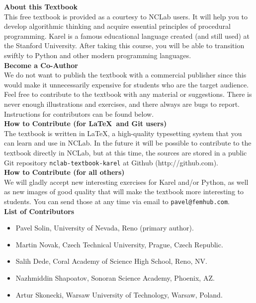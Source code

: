 \documentclass[article,A4,12pt]{llncs}
\begin{document}
{
\noindent
{\bf About this Textbook}\\[4mm]
This free textbook is provided as a courtesy to NCLab users. 
It will help you to develop algorithmic thinking and acquire essential
principles of procedural programming. Karel is a famous educational language 
created (and still used) at the Stanford University. After taking this course, 
you will be able to transition swiftly to Python and other modern programming 
languages. \\[4mm]

\noindent
{\bf Become a Co-Author}\\[4mm]
We do not want to publish the textbook with a commercial publisher since this 
would make it unnecessarily expensive for students who are the target audience. 
Feel free to contribute to the textbook with any material or suggestions. 
There is never enough illustrations and exercises, and there always are bugs 
to report. Instructions for contributors can be found below.\\[4mm]

\noindent
{\bf How to Contribute (for \LaTeX \ and Git users)}\\[4mm]
\noindent
The textbook is written in \LaTeX, a high-quality typesetting system that 
you can learn and use in NCLab. In the future it will be possible to contribute to 
the textbook directly in NCLab, but at this time, the sources are stored 
in a public Git repository {\tt nclab-textbook-karel} at Github (http://github.com). \\[4mm]

\noindent
{\bf How to Contribute (for all others)}\\[4mm]
\noindent
We will gladly accept new interesting exercises for Karel and/or Python, as well as
new images of good quality that will make the textbook more interesting to students. You
can send those at any time via email to {\tt pavel@femhub.com}.\\[4mm]

\noindent
{\bf List of Contributors}
\begin{itemize}
\item Pavel Solin, University of Nevada, Reno (primary author). 
\item Martin Novak, Czech Technical University, Prague, Czech Republic.
\item Salih Dede, Coral Academy of Science High School, Reno, NV.
\item Nazhmiddin Shapoatov, Sonoran Science Academy, Phoenix, AZ.
\item Artur Skonecki, Warsaw University of Technology, Warsaw, Poland.
\end{itemize}
\vspace{6mm}


}
\end{document}
